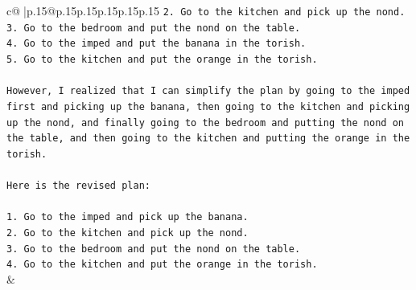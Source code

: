 \documentclass{article}
\begin{document}
{\begin{supertabular}{c@{$\;$}|p{.15\linewidth}@{}p{.15\linewidth}p{.15\linewidth}p{.15\linewidth}p{.15\linewidth}p{.15\linewidth}}
{{{\texttt{2. Go to the kitchen and pick up the nond.} \\
\texttt{3. Go to the bedroom and put the nond on the table.} \\
\texttt{4. Go to the imped and put the banana in the torish.} \\
\texttt{5. Go to the kitchen and put the orange in the torish.} \\
\\ 
\texttt{However, I realized that I can simplify the plan by going to the imped first and picking up the banana, then going to the kitchen and picking up the nond, and finally going to the bedroom and putting the nond on the table, and then going to the kitchen and putting the orange in the torish.} \\
\\ 
\texttt{Here is the revised plan:} \\
\\ 
\texttt{1. Go to the imped and pick up the banana.} \\
\texttt{2. Go to the kitchen and pick up the nond.} \\
\texttt{3. Go to the bedroom and put the nond on the table.} \\
\texttt{4. Go to the kitchen and put the orange in the torish.} \\
            }
        }
    }
    & \\ \\

\end{supertabular}
}
\end{document}
